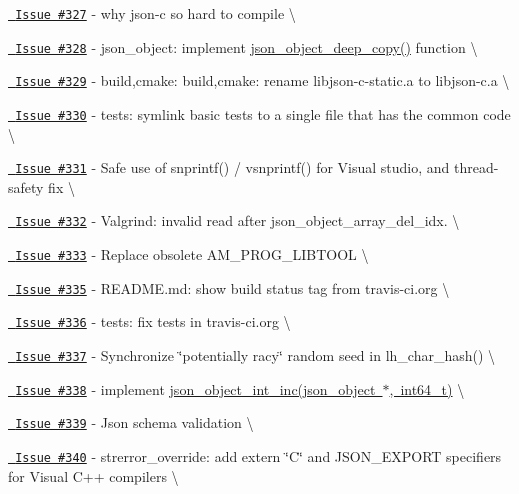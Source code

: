 \begin{DoxyItemize}
\item \href{https://github.com/json-c/json-c/issues/327}{\texttt{ Issue \#327}} -\/ why json-\/c so hard to compile \textbackslash{}
\item \href{https://github.com/json-c/json-c/issues/328}{\texttt{ Issue \#328}} -\/ json\+\_\+object\+: implement \mbox{\hyperlink{json__object_8h_aaac16505f13bc56accfad82604d8bcdc}{json\+\_\+object\+\_\+deep\+\_\+copy()}} function \textbackslash{}
\item \href{https://github.com/json-c/json-c/issues/329}{\texttt{ Issue \#329}} -\/ build,cmake\+: build,cmake\+: rename libjson-\/c-\/static.\+a to libjson-\/c.\+a \textbackslash{}
\item \href{https://github.com/json-c/json-c/issues/330}{\texttt{ Issue \#330}} -\/ tests\+: symlink basic tests to a single file that has the common code \textbackslash{}
\item \href{https://github.com/json-c/json-c/issues/331}{\texttt{ Issue \#331}} -\/ Safe use of snprintf() / vsnprintf() for Visual studio, and thread-\/safety fix \textbackslash{}
\item \href{https://github.com/json-c/json-c/issues/332}{\texttt{ Issue \#332}} -\/ Valgrind\+: invalid read after json\+\_\+object\+\_\+array\+\_\+del\+\_\+idx. \textbackslash{}
\item \href{https://github.com/json-c/json-c/issues/333}{\texttt{ Issue \#333}} -\/ Replace obsolete AM\+\_\+\+PROG\+\_\+\+LIBTOOL \textbackslash{}
\item \href{https://github.com/json-c/json-c/issues/335}{\texttt{ Issue \#335}} -\/ README.\+md\+: show build status tag from travis-\/ci.\+org \textbackslash{}
\item \href{https://github.com/json-c/json-c/issues/336}{\texttt{ Issue \#336}} -\/ tests\+: fix tests in travis-\/ci.\+org \textbackslash{}
\item \href{https://github.com/json-c/json-c/issues/337}{\texttt{ Issue \#337}} -\/ Synchronize \char`\"{}potentially racy\char`\"{} random seed in lh\+\_\+char\+\_\+hash() \textbackslash{}
\item \href{https://github.com/json-c/json-c/issues/338}{\texttt{ Issue \#338}} -\/ implement \mbox{\hyperlink{json__object_8h_a25691322b2d1ab24a3797e5752eb659f}{json\+\_\+object\+\_\+int\+\_\+inc(json\+\_\+object $\ast$, int64\+\_\+t)}} \textbackslash{}
\item \href{https://github.com/json-c/json-c/issues/339}{\texttt{ Issue \#339}} -\/ Json schema validation \textbackslash{}
\item \href{https://github.com/json-c/json-c/issues/340}{\texttt{ Issue \#340}} -\/ strerror\+\_\+override\+: add extern \char`\"{}\+C\char`\"{} and JSON\+\_\+\+EXPORT specifiers for Visual C++ compilers \textbackslash{}

\end{DoxyItemize}
